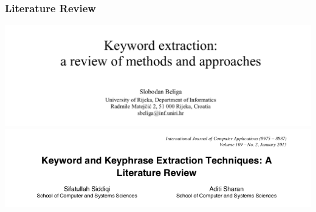 \documentclass{beamer}
\begin{document}
\begin{frame}
\frametitle{Literature Review}
\includegraphics[width= 1\textwidth]{img/lit_review}
\vspace{0.2in}
\includegraphics[width= 1\textwidth]{img/lit_review2}
\end{frame}
\end{document}
